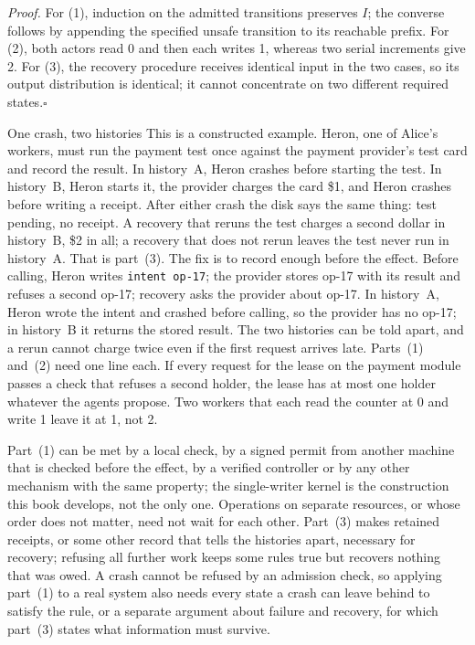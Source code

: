 \noindent\textit{Proof.} For (1), induction on the admitted transitions preserves $I$; the converse follows by appending the specified unsafe transition to its reachable prefix. For (2), both actors read 0 and then each writes 1, whereas two serial increments give 2. For (3), the recovery procedure receives identical input in the two cases, so its output distribution is identical; it cannot concentrate on two different required states.\hfill$\square$

\begin{pdexample}{One crash, two histories}
This is a constructed example. Heron, one of Alice's workers, must run the
payment test once against the payment provider's test card and record the
result. In history~A, Heron
crashes before starting the test. In history~B, Heron starts it, the provider
charges the card \$1, and Heron crashes before writing a receipt. After either
crash the disk says the same thing: test pending, no receipt. A recovery that
reruns the test charges a second dollar in history~B, \$2 in all; a recovery
that does not rerun leaves the test never run in history~A. That is part~(3).
The fix is to record enough before the effect. Before calling, Heron writes
\texttt{intent op-17}; the provider stores op-17 with its result and refuses a
second op-17; recovery asks the provider about op-17. In history~A, Heron
wrote the intent and crashed before calling, so the provider has no op-17; in
history~B it returns the stored result. The two histories can be told apart,
and a rerun cannot charge twice even if the first request arrives late.
Parts~(1) and~(2) need one line each. If every request for the lease on the
payment module passes a check that refuses a second holder, the lease has at
most one holder whatever the agents propose. Two workers that each read the counter at 0 and write 1
leave it at 1, not 2.
\end{pdexample}

Part~(1) can be met by a local check, by a signed permit from another machine that is checked before the effect, by a verified controller or by any other mechanism with the same property; the single-writer kernel is the construction this book develops, not the only one. Operations on separate resources, or whose order does not matter, need not wait for each other. Part~(3) makes retained receipts, or some other record that tells the histories apart, necessary for recovery; refusing all further work keeps some rules true but recovers nothing that was owed. A crash cannot be refused by an admission check, so applying part~(1) to a real system also needs every state a crash can leave behind to satisfy the rule, or a separate argument about failure and recovery, for which part~(3) states what information must survive.

